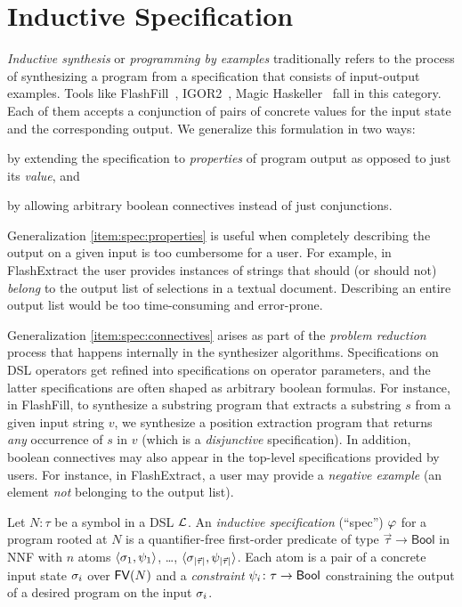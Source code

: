 \section{Inductive Specification}
\label{sec:background:spec}

\emph{Inductive synthesis} or \emph{programming by examples} traditionally refers to the process of synthesizing a
program from a specification that consists of input-output examples.
Tools like FlashFill~\cite{flashfill}, IGOR2~\cite{igor2}, Magic Haskeller~\cite{magichaskeller}
fall in this category.
Each of them accepts a conjunction of pairs of concrete values for the input state and the corresponding output.
We generalize this formulation in two ways:
\begin{enumerate*}[label=\textbf{(\alph*)}]
    \item by extending the specification to \emph{properties} of program output as opposed to just its \emph{value}, and
        \label{item:spec:properties}
    \item by allowing arbitrary boolean connectives instead of just conjunctions. \label{item:spec:connectives}
\end{enumerate*}

Generalization \ref*{item:spec:properties} is useful when completely describing the output on a given input is too
cumbersome for a user.
For example, in FlashExtract the user provides instances of strings that should (or should not) \emph{belong} to the
output list of selections in a textual document.
Describing an entire output list would be too time-consuming and error-prone.

Generalization \ref*{item:spec:connectives} arises as part of the \emph{problem reduction} process that happens
internally in the synthesizer algorithms.
Specifications on DSL operators get refined into specifications on operator parameters, and the latter specifications
are often shaped as arbitrary boolean formulas.
For instance, in FlashFill, to synthesize a substring program that extracts a substring $s$ from a given input
string $v$, we synthesize a position extraction program that returns \emph{any} occurrence of $s$ in $v$ (which is a
\emph{disjunctive} specification).
In addition, boolean connectives may also appear in the top-level specifications provided by users.
For instance, in FlashExtract, a user may provide a \emph{negative example} (an element \emph{not} belonging to the
output list).

\begin{defn}
    Let $N\colon\tau$ be a symbol in a DSL $\mathcal{L}$.
    An \emph{inductive specification} (``spec'') $\varphi$ for a program rooted at $N$ is a quantifier-free first-order
    predicate of type $\vec{\tau} \to \mathsf{Bool}$ in NNF with $n$ atoms $\langle \sigma_1, \psi_1\rangle$,
    \dots, $\langle \sigma_{|\vec{\tau}|}, \psi_{|\vec{\tau}|}\rangle$.
    Each atom is a pair of a concrete input state $\sigma_i$ over $\mathsf{FV}(N)$ and a \emph{constraint}
    $\psi_i\colon \tau \to \mathsf{Bool}$ constraining the output of a desired program on the input $\sigma_i$.
\end{defn}

